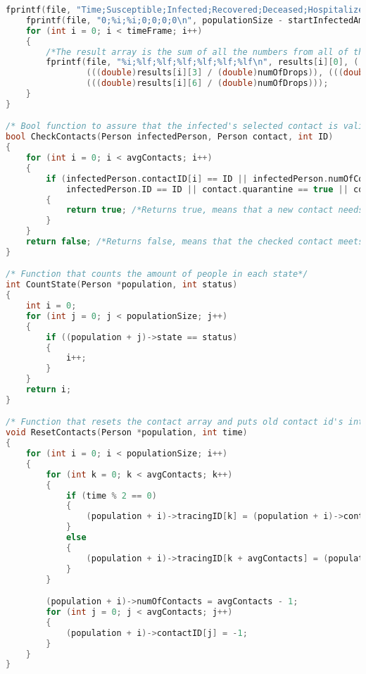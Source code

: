 \begin{lstlisting}[language=c, caption={Our simulations written in c}, captionpos=b, label={snippet:LABELNAVN}]
    fprintf(file, "Time;Susceptible;Infected;Recovered;Deceased;Hospitalized;Quarantined\n");
    fprintf(file, "0;%i;%i;0;0;0;0\n", populationSize - startInfectedAmount, startInfectedAmount);
    for (int i = 0; i < timeFrame; i++)
    {
        /*The result array is the sum of all the numbers from all of the drops on all days. This prints the average for each result for all of the days*/
        fprintf(file, "%i;%lf;%lf;%lf;%lf;%lf;%lf\n", results[i][0], ((double)(results[i][1] / (double)numOfDrops)), (((double)results[i][2] / (double)numOfDrops)),
                (((double)results[i][3] / (double)numOfDrops)), (((double)results[i][4] / (double)numOfDrops)), (((double)results[i][5] / (double)numOfDrops)),
                (((double)results[i][6] / (double)numOfDrops)));
    }
}

/* Bool function to assure that the infected's selected contact is valid*/
bool CheckContacts(Person infectedPerson, Person contact, int ID)
{
    for (int i = 0; i < avgContacts; i++)
    {
        if (infectedPerson.contactID[i] == ID || infectedPerson.numOfContacts < 0 || contact.numOfContacts < 0 ||
            infectedPerson.ID == ID || contact.quarantine == true || contact.state == deceased)
        {
            return true; /*Returns true, means that a new contact needs to be found*/
        }
    }
    return false; /*Returns false, means that the checked contact meets all of the criteria for being selected*/
}

/* Function that counts the amount of people in each state*/
int CountState(Person *population, int status)
{
    int i = 0;
    for (int j = 0; j < populationSize; j++)
    {
        if ((population + j)->state == status)
        {
            i++;
        }
    }
    return i;
}

/* Function that resets the contact array and puts old contact id's into the tracing array*/
void ResetContacts(Person *population, int time)
{
    for (int i = 0; i < populationSize; i++)
    {
        for (int k = 0; k < avgContacts; k++)
        {
            if (time % 2 == 0)
            {
                (population + i)->tracingID[k] = (population + i)->contactID[k];
            }
            else
            {
                (population + i)->tracingID[k + avgContacts] = (population + i)->contactID[k];
            }
        }

        (population + i)->numOfContacts = avgContacts - 1;
        for (int j = 0; j < avgContacts; j++)
        {
            (population + i)->contactID[j] = -1;
        }
    }
}


\end{lstlisting}
